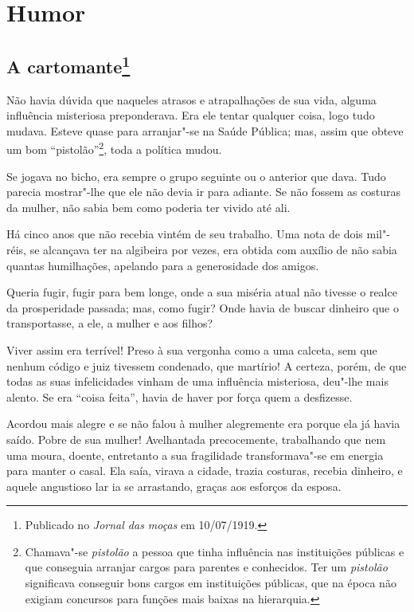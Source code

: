\part{Humor}

\chapter[A cartomante]{A cartomante\footnote[*]{Publicado no \emph{Jornal das moças} em 10/07/1919.}}

Não havia dúvida que naqueles atrasos e atrapalhações de sua vida,
alguma influência misteriosa preponderava. Era ele tentar qualquer
coisa, logo tudo mudava. Esteve quase para arranjar"-se na Saúde Pública;
mas, assim que obteve um bom ``pistolão''\footnote{Chamava"-se
  \emph{pistolão} a pessoa que tinha influência nas instituições
  públicas e que conseguia arranjar cargos para parentes e conhecidos.
  Ter um \emph{pistolão} significava conseguir bons cargos em
  instituições públicas, que na época não exigiam concursos para funções
  mais baixas na hierarquia.}, toda a política mudou.

Se jogava no bicho, era sempre o grupo seguinte ou o anterior que dava.
Tudo parecia mostrar"-lhe que ele não devia ir para adiante. Se não
fossem as costuras da mulher, não sabia bem como poderia ter vivido até
ali.

Há cinco anos que não recebia vintém de seu trabalho. Uma nota de dois
mil"-réis, se alcançava ter na algibeira por vezes, era obtida com
auxílio de não sabia quantas humilhações, apelando para a generosidade
dos amigos.

Queria fugir, fugir para bem longe, onde a sua miséria atual não tivesse
o realce da prosperidade passada; mas, como fugir? Onde havia de buscar
dinheiro que o transportasse, a ele, a mulher e aos filhos?

Viver assim era terrível! Preso à sua vergonha como a uma calceta, sem
que nenhum código e juiz tivessem condenado, que martírio! A certeza,
porém, de que todas as suas infelicidades vinham de uma influência
misteriosa, deu"-lhe mais alento. Se era ``coisa feita'', havia de haver
por força quem a desfizesse.

Acordou mais alegre e se não falou à mulher alegremente era porque ela
já havia saído. Pobre de sua mulher! Avelhantada precocemente,
trabalhando que nem uma moura, doente, entretanto a sua fragilidade
transformava"-se em energia para manter o casal. Ela saía, virava a
cidade, trazia costuras, recebia dinheiro, e aquele angustioso lar ia se
arrastando, graças aos esforços da esposa.

